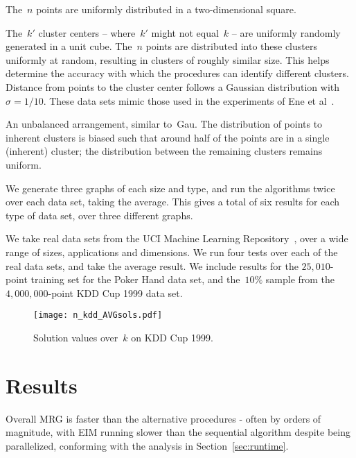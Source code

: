 \documentclass[11pt]{article}
\newcommand{\ours}{{\sc MRG}\xspace}
\newcommand{\ene}{{\sc EIM}\xspace}
\newcommand{\unif}{{\sc Unif}\xspace}
\newcommand{\gauss}{{\sc Gau}\xspace}
\newcommand{\unbalanced}{{\sc UnB}\xspace}
\newcommand{\poker}{{\sc Poker Hand}\xspace}
\newcommand{\kdd}{{\sc KDD Cup}\xspace}
\begin{document}
\begin{description}
\setlength\itemsep{0.5em}
\item[\unif] The~$n$ points are uniformly distributed in a two-dimensional square.
\item[\gauss] 
The~$k'$ cluster centers -- where~$k'$ might not equal~$k$ -- are uniformly randomly generated in a unit cube.
The~$n$ points are distributed into these clusters uniformly at random, resulting in clusters of roughly similar size.
This helps determine the accuracy with which the procedures can
identify different clusters.
Distance from points to the cluster center follows a Gaussian distribution with
$\sigma=1/10$.
These data sets mimic those used in the experiments of Ene et al~\cite{ene2011fast}.
\item[\unbalanced]
An unbalanced arrangement, similar to~\gauss.
The distribution of points to inherent clusters is biased
such that around half of the points are in a single
(inherent) cluster; the distribution between the remaining clusters remains uniform.
\end{description}


We generate three graphs of each size and type, and run the algorithms twice over each data set, taking the average.
This gives a total of six results for each type of data set, over three different graphs.

We take real data sets from the UCI Machine Learning Repository~\cite{Lichman:2013}, over a wide range of sizes, applications and dimensions. 
We run four tests over each of the real data sets, and take the average result.
We include results for the $25,010$-point training set for the \poker data
set, and the~$10\%$ sample from the $4,000,000$-point \kdd 1999 data set.


\begin{figure}[!t]
\center
{\texttt{[image: n\_kdd\_AVGsols.pdf]}}
\caption{\small Solution values over~$k$
on \kdd 1999.}\vspace{-3mm}
\label{fig_real}
\end{figure}

\vspace{-2mm}
\section{Results}
\vspace{-2mm}
Overall \ours is faster than the alternative procedures - often by orders of magnitude,
with \ene running slower than the sequential algorithm despite being parallelized, conforming with the analysis in Section~\ref{sec:runtime}. 
\vspace{-1mm}
\end{document}
